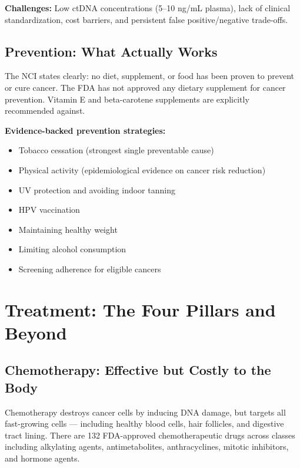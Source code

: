 \textbf{Challenges:} Low ctDNA concentrations (5--10 ng/mL plasma), lack
of clinical standardization, cost barriers, and persistent false
positive/negative trade-offs.

\subsection{Prevention: What Actually
Works}\label{prevention-what-actually-works}

The NCI states clearly: no diet, supplement, or food has been proven to
prevent or cure cancer. The FDA has not approved any dietary supplement
for cancer prevention. Vitamin E and beta-carotene supplements are
explicitly recommended against.

\textbf{Evidence-backed prevention strategies:}

\begin{itemize}
\tightlist
\item
  Tobacco cessation (strongest single preventable cause)
\item
  Physical activity (epidemiological evidence on cancer risk reduction)
\item
  UV protection and avoiding indoor tanning
\item
  HPV vaccination
\item
  Maintaining healthy weight
\item
  Limiting alcohol consumption
\item
  Screening adherence for eligible cancers
\end{itemize}

\newpage

\section{Treatment: The Four Pillars and
Beyond}\label{treatment-the-four-pillars-and-beyond}

\subsection{Chemotherapy: Effective but Costly to the
Body}\label{chemotherapy-effective-but-costly-to-the-body}

Chemotherapy destroys cancer cells by inducing DNA damage, but targets
all fast-growing cells --- including healthy blood cells, hair
follicles, and digestive tract lining. There are 132 FDA-approved
chemotherapeutic drugs across classes including alkylating agents,
antimetabolites, anthracyclines, mitotic inhibitors, and hormone agents.

